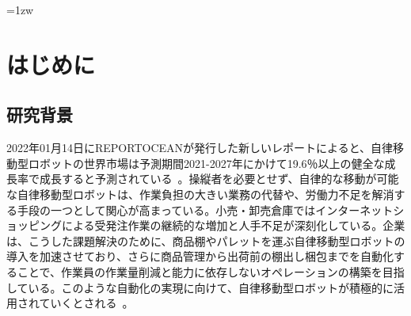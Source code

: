 \documentclass[a4paper]{jreport}	%
\begin{document}
\makecover

\addtolength{\textheight}{-5mm}	%
\setlength{\footskip}{15mm}	%
\fontsize{11pt}{15pt}\selectfont

\pagebreak\setcounter{page}{1}
\pagestyle{plain}
\tableofcontents
\listoffigures

\parindent=1zw	%
\pagebreak\setcounter{page}{1}
\pagestyle{plain}



\chapter{はじめに}
\section{研究背景}


2022年01月14日にREPORTOCEANが発行した新しいレポートによると、自律移動型ロボットの世界市場は予測期間2021-2027年にかけて19.6％以上の健全な成長率で成長すると予測されている~\cite{report1}。操縦者を必要とせず、自律的な移動が可能な自律移動型ロボットは、作業負担の大きい業務の代替や、労働力不足を解消する手段の一つとして関心が高まっている。小売・卸売倉庫ではインターネットショッピングによる受発注作業の継続的な増加と人手不足が深刻化している。企業は、こうした課題解決のために、商品棚やパレットを運ぶ自律移動型ロボットの導入を加速させており、さらに商品管理から出荷前の棚出し梱包までを自動化することで、作業員の作業量削減と能力に依存しないオペレーションの構築を目指している。このような自動化の実現に向けて、自律移動型ロボットが積極的に活用されていくとされる~\cite{report2}。
\end{document}
